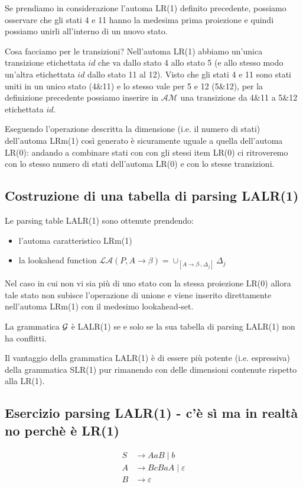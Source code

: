 \documentclass[class=book, crop=false, oneside, 12pt]{standalone}
\begin{document}
Se prendiamo in considerazione l'automa LR(1) definito precedente, possiamo osservare che gli stati 4 e 11 hanno la medesima prima proiezione e quindi possiamo unirli all'interno di un nuovo stato.

Cosa facciamo per le transizioni? Nell'automa LR(1) abbiamo un'unica transizione etichettata \(id\) che va dallo stato 4 allo stato 5 (e allo stesso modo un'altra etichettata \(id\) dallo stato 11 al 12). Visto che gli stati 4 e 11 sono stati uniti in un unico stato (4\&11) e lo stesso vale per 5 e 12 (5\&12), per la definizione precedente possiamo inserire in \(\mathcal{AM}\) una transizione da 4\&11 a 5\&12 etichettata \(id\).

Eseguendo l'operazione descritta la dimensione (i.e. il numero di stati) dell'automa LRm(1) così generato è sicuramente uguale a quella dell'automa LR(0): andando a combinare stati con con gli stessi item LR(0) ci ritroveremo con lo stesso numero di stati dell'automa LR(0) e con lo stesse transizioni. 

\subsection{Costruzione di una tabella di parsing LALR(1)}
\label{subsec:lalr1-parsing-table}

Le parsing table LALR(1) sono ottenute prendendo:

\begin{itemize}
    \item l'automa caratteristico LRm(1)
    \item la lookahead function \(\mathcal{LA}(P, A \to \beta) = \cup_{[A \to \beta \cdot, \Delta_j]} \Delta_j\)
\end{itemize}

Nel caso in cui non vi sia più di uno stato con la stessa proiezione LR(0) allora tale stato non subisce l'operazione di unione e viene inserito direttamente nell'automa LRm(1) con il medesimo lookahead-set.

La grammatica \(\mathcal{G}\) è LALR(1) se e solo se la sua tabella di parsing LALR(1) non ha conflitti. 

Il vantaggio della grammatica LALR(1) è di essere più potente (i.e. espressiva) della grammatica SLR(1) pur rimanendo con delle dimensioni contenute rispetto alla LR(1). 

\subsection*{Esercizio parsing LALR(1) - c'è sì ma in realtà no perchè è LR(1)}
\begin{align*}
    S &\to AaB \mid b \\
    A &\to BcBaA \mid \varepsilon \\
    B &\to \varepsilon
\end{align*}
\end{document}
